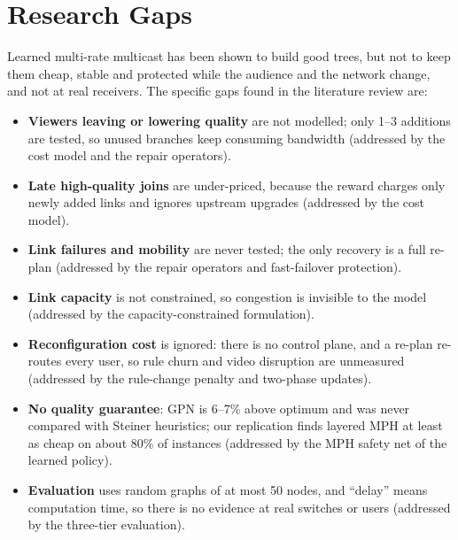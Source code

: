 \section{Research Gaps}\label{sec:lr_gap}
\noindent Learned multi-rate multicast has been shown to build good trees, but not to keep them cheap, stable and protected while the audience and the network change, and not at real receivers. The specific gaps found in the literature review are:
\begin{itemize}
    \item \textbf{Viewers leaving or lowering quality} are not modelled; only 1--3 additions are tested, so unused branches keep consuming bandwidth (addressed by the cost model and the repair operators).
    \item \textbf{Late high-quality joins} are under-priced, because the reward charges only newly added links and ignores upstream upgrades (addressed by the cost model).
    \item \textbf{Link failures and mobility} are never tested; the only recovery is a full re-plan (addressed by the repair operators and fast-failover protection).
    \item \textbf{Link capacity} is not constrained, so congestion is invisible to the model (addressed by the capacity-constrained formulation).
    \item \textbf{Reconfiguration cost} is ignored: there is no control plane, and a re-plan re-routes every user, so rule churn and video disruption are unmeasured (addressed by the rule-change penalty and two-phase updates).
    \item \textbf{No quality guarantee}: GPN is 6--7\% above optimum and was never compared with Steiner heuristics; our replication finds layered MPH at least as cheap on about 80\% of instances (addressed by the MPH safety net of the learned policy).
    \item \textbf{Evaluation} uses random graphs of at most 50 nodes, and ``delay'' means computation time, so there is no evidence at real switches or users (addressed by the three-tier evaluation).
\end{itemize}

